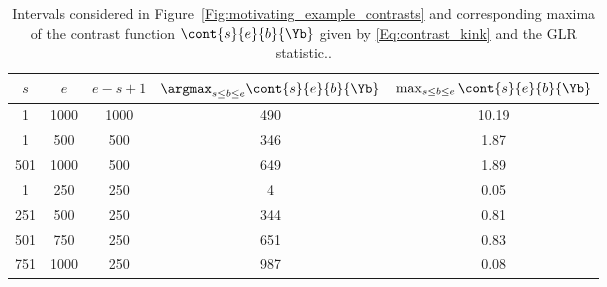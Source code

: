 \begin{table}[ht]
\centering
\begin{tabular}{ccccc}
  \hline
$s$ & $e$ & $e-s+1$ & $\argmax_{s\leq b \leq e}\cont{s}{e}{b}{\Yb}$ & $\max_{s\leq b \leq e}\cont{s}{e}{b}{\Yb}$ \\ 
  \hline
  1 & 1000 & 1000 & 490 & 10.19 \\ 
    1 & 500 & 500 & 346 & 1.87 \\ 
  501 & 1000 & 500 & 649 & 1.89 \\ 
    1 & 250 & 250 &   4 & 0.05 \\ 
  251 & 500 & 250 & 344 & 0.81 \\ 
  501 & 750 & 250 & 651 & 0.83 \\ 
  751 & 1000 & 250 & 987 & 0.08 \\ 
   \hline
\end{tabular}
\caption{\label{Table:motivating_example_contrasts} Intervals considered in Figure~\ref{Fig:motivating_example_contrasts} and corresponding maxima of the contrast function  $\cont{s}{e}{b}{\Yb}$ given by \eqref{Eq:contrast_kink} and the GLR statistic..} 
\end{table}
